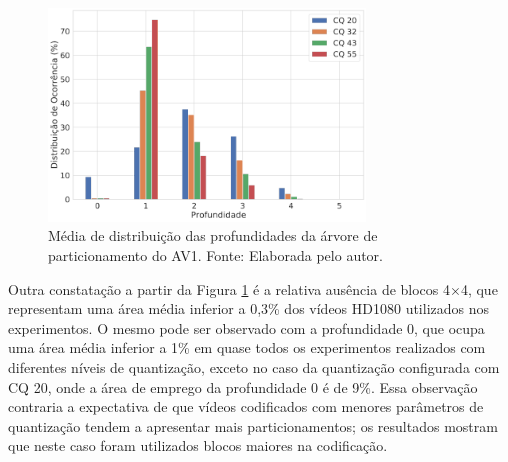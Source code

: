 \begin{figure}
    \centering
    \includegraphics[width=0.75\textwidth]{FIGURES/fig_16.png}
    \caption{Média de distribuição das profundidades da árvore de particionamento do AV1. Fonte: Elaborada pelo autor.}
    \label{fig:16}
\end{figure}

Outra constatação a partir da Figura \ref{fig:16} é a relativa ausência de blocos 4$\times$4, que representam uma área média inferior a 0,3\% dos vídeos HD1080 utilizados nos experimentos. O mesmo pode ser observado com a profundidade 0, que ocupa uma área média inferior a 1\% em quase todos os experimentos realizados com diferentes níveis de quantização, exceto no caso da quantização configurada com CQ 20, onde a área de emprego da profundidade 0 é de 9\%. Essa observação contraria a expectativa de que vídeos codificados com menores parâmetros de quantização tendem a apresentar mais particionamentos; os resultados mostram que neste caso foram utilizados blocos maiores na codificação.

